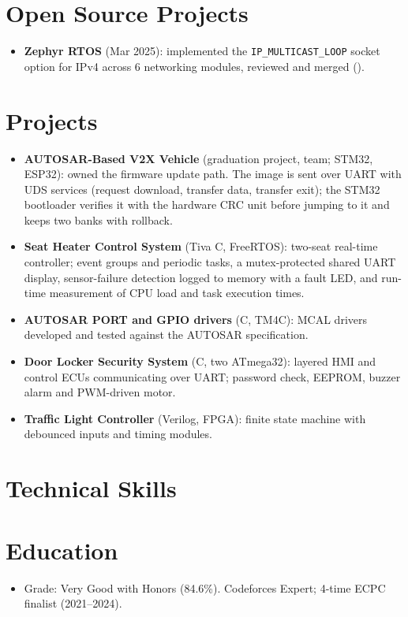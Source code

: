 \documentclass[10pt]{article}
\begin{document}
\section*{Open Source Projects}
\begin{itemize}
  \item \textbf{Zephyr RTOS} (Mar 2025): implemented the \texttt{IP\_MULTICAST\_LOOP} socket option for IPv4 across 6 networking modules, reviewed and merged ().
\end{itemize}

\section*{Projects}
\begin{itemize}
  \item \textbf{AUTOSAR-Based V2X Vehicle} (graduation project, team; STM32, ESP32): owned the firmware update path. The image is sent over UART with UDS services (request download, transfer data, transfer exit); the STM32 bootloader verifies it with the hardware CRC unit before jumping to it and keeps two banks with rollback. 
  \item \textbf{Seat Heater Control System} (Tiva C, FreeRTOS): two-seat real-time controller; event groups and periodic tasks, a mutex-protected shared UART display, sensor-failure detection logged to memory with a fault LED, and run-time measurement of CPU load and task execution times. 
  \item \textbf{AUTOSAR PORT and GPIO drivers} (C, TM4C): MCAL drivers developed and tested against the AUTOSAR specification.
  \item \textbf{Door Locker Security System} (C, two ATmega32): layered HMI and control ECUs communicating over UART; password check, EEPROM, buzzer alarm and PWM-driven motor. 
  \item \textbf{Traffic Light Controller} (Verilog, FPGA): finite state machine with debounced inputs and timing modules. 
\end{itemize}

\section*{Technical Skills}

\section*{Education}
\begin{itemize}
  \item Grade: Very Good with Honors (84.6\%). Codeforces Expert; 4-time ECPC finalist (2021--2024).
\end{itemize}
\end{document}
